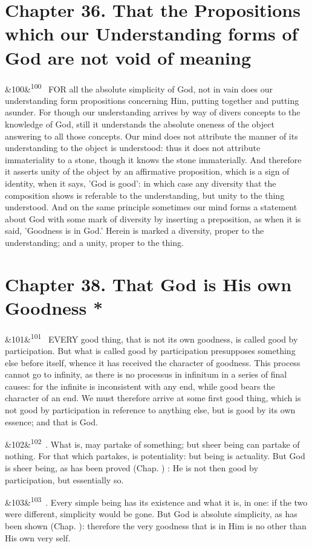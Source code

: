\documentclass[12pt]{article}
\newcommand{\para}[1][]{\par\noindent\ifx&#1&\else\textsuperscript{\footnotesize #1}~\fi}
\begin{document}
\section*{Chapter 36. That the Propositions which our Understanding forms of God are not void of meaning}

\para[100] FOR all the absolute simplicity of God, not in vain does our understanding form propositions concerning Him, putting together and putting asunder. For though our understanding arrives by way of divers concepts to the knowledge of God, still it understands the absolute oneness of the object answering to all those concepts. Our mind does not attribute the manner of its understanding to the object is understood: thus it does not attribute immateriality to a stone, though it knows the stone immaterially. And therefore it asserts unity of the object by an affirmative proposition, which is a sign of identity, when it says, 'God is good': in which case any diversity that the composition shows is referable to the understanding, but unity to the thing understood. And on the same principle sometimes our mind forms a statement about God with some mark of diversity by inserting a preposition, as when it is said, 'Goodness is in God.' Herein is marked a diversity, proper to the understanding; and a unity, proper to the thing.

\section*{Chapter 38. That God is His own Goodness *}

\para[101] EVERY good thing, that is not its own goodness, is called good by participation. But what is called good by participation presupposes something else before itself, whence it has received the character of goodness. This process cannot go to infinity, as there is no processus in infinitum in a series of final causes: for the infinite is inconsistent with any end, while good bears the character of an end. We must therefore arrive at some first good thing, which is not good by participation in reference to anything else, but is good by its own essence; and that is God.

\para[102] 4. What is, may partake of something; but sheer being can partake of nothing. For that which partakes, is potentiality: but being is actuality. But God is sheer being, as has been proved (Chap. ) : He is not then good by participation, but essentially so.

\para[103] 5. Every simple being has its existence and what it is, in one: if the two were different, simplicity would be gone. But God is absolute simplicity, as has been shown (Chap. ): therefore the very goodness that is in Him is no other than His own very self.
\end{document}
